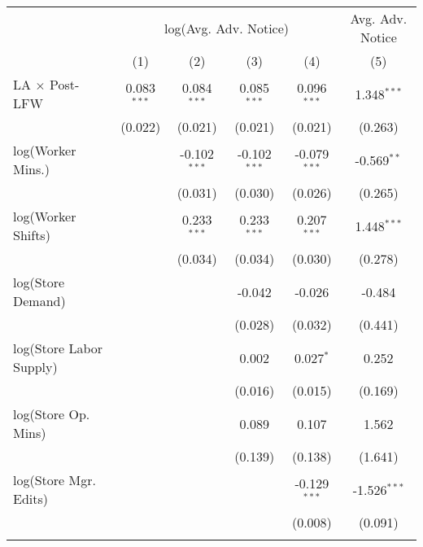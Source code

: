 
\begingroup
\centering
\scriptsize
\begin{tabular}{lccccc}
   \toprule
    & \multicolumn{4}{c}{log(Avg. Adv. Notice)} & Avg. Adv. Notice\\
                           & (1)           & (2)            & (3)            & (4)            & (5)\\  
   \midrule 
   LA $\times$ Post-LFW    & 0.083$^{***}$ & 0.084$^{***}$  & 0.085$^{***}$  & 0.096$^{***}$  & 1.348$^{***}$\\   
                           & (0.022)       & (0.021)        & (0.021)        & (0.021)        & (0.263)\\   
   log(Worker Mins.)              &               & -0.102$^{***}$ & -0.102$^{***}$ & -0.079$^{***}$ & -0.569$^{**}$\\   
                           &               & (0.031)        & (0.030)        & (0.026)        & (0.265)\\   
   log(Worker Shifts)             &               & 0.233$^{***}$  & 0.233$^{***}$  & 0.207$^{***}$  & 1.448$^{***}$\\   
                           &               & (0.034)        & (0.034)        & (0.030)        & (0.278)\\   
   log(Store Demand)       &               &                & -0.042         & -0.026         & -0.484\\   
                           &               &                & (0.028)        & (0.032)        & (0.441)\\   
   log(Store Labor Supply) &               &                & 0.002          & 0.027$^{*}$    & 0.252\\   
                           &               &                & (0.016)        & (0.015)        & (0.169)\\   
   log(Store Op. Mins)     &               &                & 0.089          & 0.107          & 1.562\\   
                           &               &                & (0.139)        & (0.138)        & (1.641)\\   
   log(Store Mgr. Edits)   &               &                &                & -0.129$^{***}$ & -1.526$^{***}$\\   
                           &               &                &                & (0.008)        & (0.091)\\   
    \\

\end{tabular}
